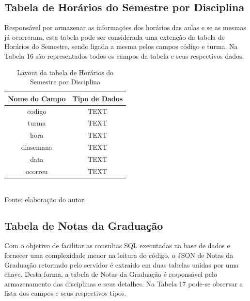 \subsection{Tabela de Horários do Semestre por Disciplina}
Responsável por armazenar as informações dos horários das aulas e se as mesmas já ocorreram, esta tabela pode ser considerada uma extenção da tabela de Horários do Semestre, sendo ligada a mesma pelos campos código e turma. Na Tabela 16 são representados todos os campos da tabela e seus respectivos dados.

\begin{table}[!hbt]
\centering
\caption[Aplicação - Tabela de Horários do Semestre por Disciplina]{Layout da tabela de Horários do Semestre por Disciplina}
\vspace{3mm}
\begin{tabular}{c|c}\hline
\textbf{Nome do Campo} & \textbf{Tipo de Dados} \\ \hline
codigo                 & TEXT                   \\ \hline
turma                  & TEXT                   \\ \hline
hora                   & TEXT                   \\ \hline
diasemana              & TEXT                   \\ \hline
data                   & TEXT                   \\ \hline
ocorreu                & TEXT                   \\ \hline
\end{tabular}
\\ Fonte: elaboração do autor.
\end{table}

\subsection{Tabela de Notas da Graduação}
Com o objetivo de facilitar as consultas SQL executadas na base de dados e fornecer uma complexidade menor na leitura do código, o JSON de Notas da Graduação retornado pelo servidor é extraido em duas tabelas unidas por uma chave. Desta forma, a tabela de Notas da Graduação é responsável pelo armazenamento das disciplinas e seus detalhes. Na Tabela 17 pode-se observar a lista dos campos e seus respectivos tipos.

